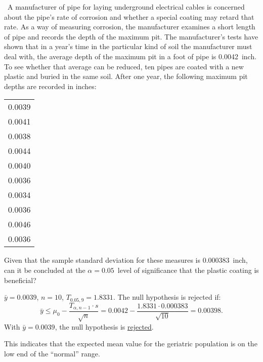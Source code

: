 \begin{problem}
  ~A manufacturer of pipe for laying underground electrical cables is concerned about the pipe's rate of corrosion and whether a special coating may retard that rate. As a way of measuring corrosion, the manufacturer examines a short length of pipe and records the depth of the maximum pit. The manufacturer's tests have shown that in a year's time in the particular kind of soil the manufacturer must deal with, the average depth of the maximum pit in a foot of pipe is 0.0042~inch.  To see whether that average can be reduced, ten pipes are coated with a new plastic and buried in the same soil. After one year, the following maximum pit depths are recorded in inches:

  \begin{center}
    \begin{tabular}{c}
      \toprule
      0.0039 \\
      0.0041 \\
      0.0038 \\
      0.0044 \\
      0.0040 \\
      0.0036 \\
      0.0034 \\
      0.0036 \\
      0.0046 \\
      0.0036 \\\bottomrule
    \end{tabular}
  \end{center}

  \noindent
  Given that the sample standard deviation for these measures is 0.000383~inch, can it be concluded at the ${\alpha= 0.05}$~level of significance that the plastic coating is beneficial?
\end{problem}

${\bar{y} = 0.0039}$, ${n= 10}$, ${T_{0.05,9} = 1.8331}$. The null hypothesis is rejected if:
\begin{equation}
  \bar{y} \leq \mu_{0} - \frac{T_{\alpha,n-1} \cdot s}{\sqrt{n}} = 0.0042 - \frac{1.8331 \cdot 0.000383}{\sqrt{10}} = 0.00398\text{.}
\end{equation}
\noindent
With ${\bar{y} = 0.0039}$, the null hypothesis is \underline{rejected}.

This indicates that the expected mean value for the geriatric population is on the low end of the ``normal'' range.
